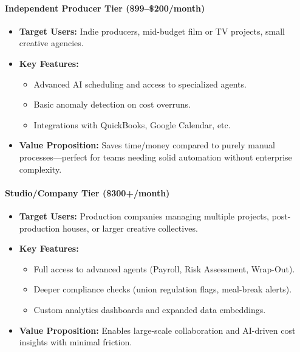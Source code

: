 \documentclass[11pt]{article}
\begin{document}
\paragraph{Independent Producer Tier (\$99--\$200/month)}
\begin{itemize}
    \item \textbf{Target Users:} Indie producers, mid-budget film or TV projects, small creative agencies.
    \item \textbf{Key Features:}
    \begin{itemize}
        \item Advanced AI scheduling and access to specialized agents.
        \item Basic anomaly detection on cost overruns.
        \item Integrations with QuickBooks, Google Calendar, etc.
    \end{itemize}
    \item \textbf{Value Proposition:} Saves time/money compared to purely manual processes—perfect for teams needing solid automation without enterprise complexity.
\end{itemize}

\paragraph{Studio/Company Tier (\$300+/month)}
\begin{itemize}
    \item \textbf{Target Users:} Production companies managing multiple projects, post-production houses, or larger creative collectives.
    \item \textbf{Key Features:}
    \begin{itemize}
        \item Full access to advanced agents (Payroll, Risk Assessment, Wrap-Out).
        \item Deeper compliance checks (union regulation flags, meal-break alerts).
        \item Custom analytics dashboards and expanded data embeddings.
    \end{itemize}
    \item \textbf{Value Proposition:} Enables large-scale collaboration and AI-driven cost insights with minimal friction.
\end{itemize}
\end{document}
